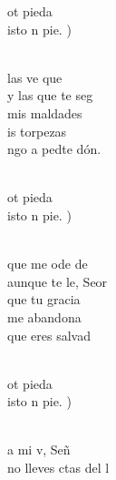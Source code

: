 \begin{cancion}%
	\begin{chorus}%
	ot pieda\\
	isto n pie. )\\
	\end{chorus}%
	\jump\\
	 las ve que  \\
	y las que te seg  \\
	 mis maldades\\
	is torpezas\\
	ngo a pedte dón.\\\jump\\
	\begin{chorus}%
	ot pieda\\
	isto n pie. )\\
	\end{chorus}%
	\jump\\
	que me ode de \\
	aunque te le, Seor\\
	 que tu gracia\\
	me abandona\\
	 que eres  salvad  \\\jump\\
	\begin{chorus}%
	ot pieda\\
	isto n pie. )\\
	\end{chorus}%
	\jump\\
	a mi v, Señ \\
	no lleves ctas del l \\

\end{cancion}
